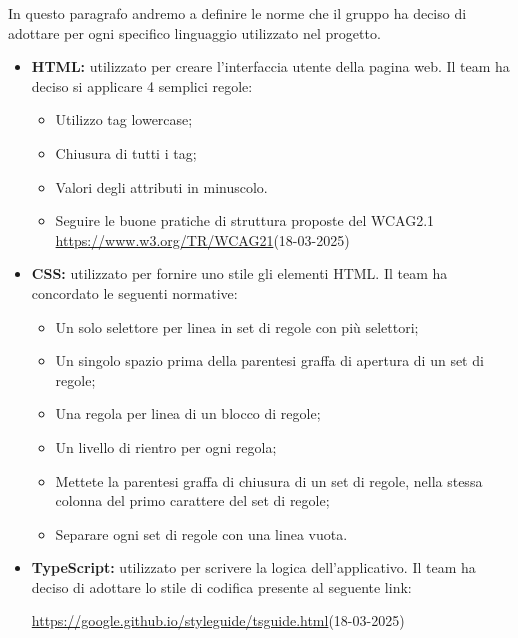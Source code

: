In questo paragrafo andremo a definire le norme che il gruppo ha deciso di adottare per ogni specifico
linguaggio utilizzato nel progetto.
\begin{itemize}
    \item \textbf{HTML:} utilizzato per creare l'interfaccia utente della pagina web. Il team ha deciso si applicare 4 semplici regole:
    \begin{itemize}
        \item Utilizzo tag lowercase;
        \item Chiusura di tutti i tag;
        \item Valori degli attributi in minuscolo.
        \item Seguire le buone pratiche di struttura proposte del WCAG2.1 \url{https://www.w3.org/TR/WCAG21}(18-03-2025)
    \end{itemize}
    \item \textbf{CSS:} utilizzato per fornire uno stile gli elementi HTML. Il team ha concordato le seguenti normative:
    \begin{itemize}
        \item Un solo selettore per linea in set di regole con più selettori;
        \item Un singolo spazio prima della parentesi graffa di apertura di un set di regole;
        \item Una regola per linea di un blocco di regole;
        \item Un livello di rientro per ogni regola;
        \item Mettete la parentesi graffa di chiusura di un set di regole, nella stessa colonna del primo carattere
        del set di regole;
        \item Separare ogni set di regole con una linea vuota.
    \end{itemize}
    \item \textbf{TypeScript:} utilizzato per scrivere la logica dell'applicativo. 
    Il team ha deciso di adottare lo stile di codifica presente al seguente link:
    \begin{center}
        \url{https://google.github.io/styleguide/tsguide.html}(18-03-2025)
    \end{center}
\end{itemize}

